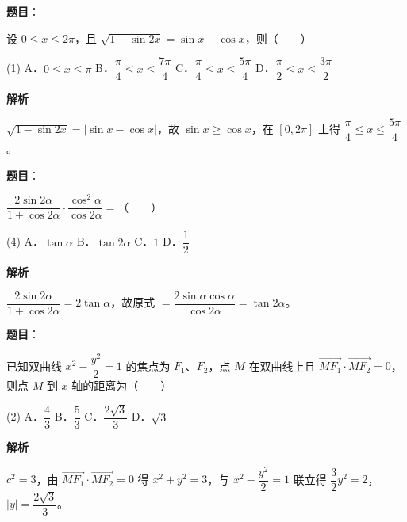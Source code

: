\begin{answer}

\textbf{题目}：

设 $0 \leqslant x \leqslant 2\pi$，且 $\sqrt{1 - \sin 2x} = \sin x - \cos x$，则\mbox{（　　）}

\begin{gkopts}(1)
\task A．$0 \leqslant x \leqslant \pi$
\task B．$\dfrac{\pi}{4} \leqslant x \leqslant \dfrac{7\pi}{4}$
\task C．$\dfrac{\pi}{4} \leqslant x \leqslant \dfrac{5\pi}{4}$
\task D．$\dfrac{\pi}{2} \leqslant x \leqslant \dfrac{3\pi}{2}$
\end{gkopts}

\textbf{解析}

$\sqrt{1 - \sin 2x} = \left|\sin x - \cos x\right|$，故 $\sin x \geqslant \cos x$，在 $[0, 2\pi]$ 上得 $\dfrac{\pi}{4} \leqslant x \leqslant \dfrac{5\pi}{4}$。


\end{answer}
\begin{answer}

\textbf{题目}：

$\dfrac{2\sin 2\alpha}{1 + \cos 2\alpha} \cdot \dfrac{\cos^2 \alpha}{\cos 2\alpha} =$\mbox{（　　）}

\begin{gkopts}(4)
\task A．$\tan \alpha$
\task B．$\tan 2\alpha$
\task C．$1$
\task D．$\dfrac{1}{2}$
\end{gkopts}

\textbf{解析}

$\dfrac{2\sin 2\alpha}{1 + \cos 2\alpha} = 2\tan\alpha$，故原式 $= \dfrac{2\sin\alpha\cos\alpha}{\cos 2\alpha} = \tan 2\alpha$。


\end{answer}
\begin{answer}

\textbf{题目}：

已知双曲线 $x^2 - \dfrac{y^2}{2} = 1$ 的焦点为 $F_1$、$F_2$，点 $M$ 在双曲线上且 $\overrightarrow{MF_1} \cdot \overrightarrow{MF_2} = 0$，则点 $M$ 到 $x$ 轴的距离为\mbox{（　　）}

\begin{gkopts}(2)
\task A．$\dfrac{4}{3}$
\task B．$\dfrac{5}{3}$
\task C．$\dfrac{2\sqrt{3}}{3}$
\task D．$\sqrt{3}$
\end{gkopts}

\textbf{解析}

$c^2 = 3$，由 $\overrightarrow{MF_1}\cdot\overrightarrow{MF_2} = 0$ 得 $x^2 + y^2 = 3$，与 $x^2 - \dfrac{y^2}{2} = 1$ 联立得 $\dfrac{3}{2}y^2 = 2$，$|y| = \dfrac{2\sqrt{3}}{3}$。


\end{answer}
